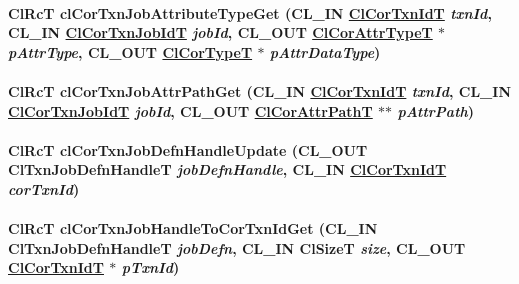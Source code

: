 \hypertarget{group__group13_ga72}{
\paragraph[clCorTxnJobAttributeTypeGet]{\setlength{\rightskip}{0pt plus 5cm}Cl\-Rc\-T cl\-Cor\-Txn\-Job\-Attribute\-Type\-Get (CL\_\-IN \hyperlink{group__group13_ga17}{Cl\-Cor\-Txn\-Id\-T} {\em txn\-Id}, CL\_\-IN \hyperlink{group__group13_ga18}{Cl\-Cor\-Txn\-Job\-Id\-T} {\em job\-Id}, CL\_\-OUT \hyperlink{group__group13_ga10}{Cl\-Cor\-Attr\-Type\-T} $\ast$ {\em p\-Attr\-Type}, CL\_\-OUT \hyperlink{group__group13_ga9}{Cl\-Cor\-Type\-T} $\ast$ {\em p\-Attr\-Data\-Type})}\hfill}
\label{group__group13_ga72}


\hypertarget{group__group13_ga74}{
\paragraph[clCorTxnJobAttrPathGet]{\setlength{\rightskip}{0pt plus 5cm}Cl\-Rc\-T cl\-Cor\-Txn\-Job\-Attr\-Path\-Get (CL\_\-IN \hyperlink{group__group13_ga17}{Cl\-Cor\-Txn\-Id\-T} {\em txn\-Id}, CL\_\-IN \hyperlink{group__group13_ga18}{Cl\-Cor\-Txn\-Job\-Id\-T} {\em job\-Id}, CL\_\-OUT \hyperlink{struct_cl_cor_attr_path}{Cl\-Cor\-Attr\-Path\-T} $\ast$$\ast$ {\em p\-Attr\-Path})}\hfill}
\label{group__group13_ga74}


\hypertarget{group__group13_ga85}{
\paragraph[clCorTxnJobDefnHandleUpdate]{\setlength{\rightskip}{0pt plus 5cm}Cl\-Rc\-T cl\-Cor\-Txn\-Job\-Defn\-Handle\-Update (CL\_\-OUT Cl\-Txn\-Job\-Defn\-Handle\-T {\em job\-Defn\-Handle}, CL\_\-IN \hyperlink{group__group13_ga17}{Cl\-Cor\-Txn\-Id\-T} {\em cor\-Txn\-Id})}\hfill}
\label{group__group13_ga85}


\hypertarget{group__group13_ga70}{
\paragraph[clCorTxnJobHandleToCorTxnIdGet]{\setlength{\rightskip}{0pt plus 5cm}Cl\-Rc\-T cl\-Cor\-Txn\-Job\-Handle\-To\-Cor\-Txn\-Id\-Get (CL\_\-IN Cl\-Txn\-Job\-Defn\-Handle\-T {\em job\-Defn}, CL\_\-IN Cl\-Size\-T {\em size}, CL\_\-OUT \hyperlink{group__group13_ga17}{Cl\-Cor\-Txn\-Id\-T} $\ast$ {\em p\-Txn\-Id})}\hfill}
\label{group__group13_ga70}


